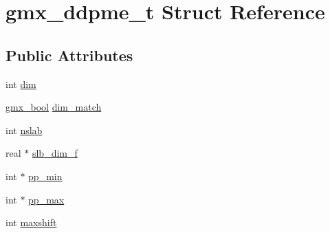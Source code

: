 \hypertarget{structgmx__ddpme__t}{\section{gmx\-\_\-ddpme\-\_\-t \-Struct \-Reference}
\label{structgmx__ddpme__t}
}
\subsection*{\-Public \-Attributes}
\begin{DoxyCompactItemize}
\item 
int \hyperlink{structgmx__ddpme__t_a6635621791f9ad76a48db3b587187760}{dim}
\item 
\hyperlink{include_2types_2simple_8h_a8fddad319f226e856400d190198d5151}{gmx\-\_\-bool} \hyperlink{structgmx__ddpme__t_ab41bfbb7aaaee707647cb37625162be9}{dim\-\_\-match}
\item 
int \hyperlink{structgmx__ddpme__t_a48a86951d813aa861bd71a67abc21e3c}{nslab}
\item 
real $\ast$ \hyperlink{structgmx__ddpme__t_a870aa66617280d8f01f51555aa894939}{slb\-\_\-dim\-\_\-f}
\item 
int $\ast$ \hyperlink{structgmx__ddpme__t_a4d467e75c40d72594a2deabf412294e2}{pp\-\_\-min}
\item 
int $\ast$ \hyperlink{structgmx__ddpme__t_acfb82d64624c3ab7296ad05c9fb02421}{pp\-\_\-max}
\item 
int \hyperlink{structgmx__ddpme__t_a5522aca2a39d534d74f31f0e8c06b845}{maxshift}
\end{DoxyCompactItemize}


